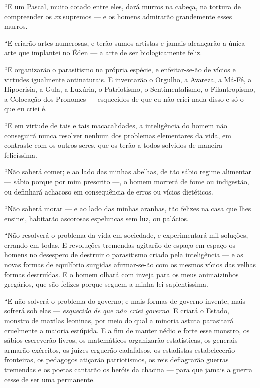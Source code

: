 ``E um Pascal, muito cotado entre eles, dará murros na cabeça, na
tortura de compreender os \emph{xx} supremos --- e os homens admirarão
grandemente esses murros.

``E criarão artes numerosas, e terão sumos artistas e jamais alcançarão
a única arte que implantei no Éden --- a arte de ser biologicamente
feliz.

``E organizarão o parasitismo na própria espécie, e enfeitar-se-ão de
vícios e virtudes igualmente antinaturais. E inventarão o Orgulho, a
Avareza, a Má-Fé, a Hipocrisia, a Gula, a Luxúria, o Patriotismo, o
Sentimentalismo, o Filantropismo, a Colocação dos Pronomes ---
esquecidos de que eu não criei nada disso e só o que eu criei é.

``E em virtude de tais e tais macacalidades, a inteligência do homem não
conseguirá nunca resolver nenhum dos problemas elementares da vida, em
contraste com os outros seres, que os terão a todos solvidos de maneira
felicíssima.

``Não saberá comer; e ao lado das minhas abelhas, de tão sábio regime
alimentar --- sábio porque por mim prescrito ---, o homem morrerá de
fome ou indigestão, ou definhará achacoso em consequência de erros ou
vícios dietéticos.

``Não saberá morar --- e ao lado das minhas aranhas, tão felizes na casa
que lhes ensinei, habitarão ascorosas espeluncas sem luz, ou palácios.

``Não resolverá o problema da vida em sociedade, e experimentará mil
soluções, errando em todas. E revoluções tremendas agitarão de espaço em
espaço os homens no desespero de destruir o parasitismo criado pela
inteligência --- e as novas formas de equilíbrio surgidas afirmar-se-ão
com os mesmos vícios das velhas formas destruídas. E o homem olhará com
inveja para os meus animaizinhos gregários, que são felizes porque
seguem a minha lei sapientíssima.

``E não solverá o problema do governo; e mais formas de governo invente,
mais sofrerá sob elas --- \emph{esquecido de que não criei governo}. E
criará o Estado, monstro de maxilas leoninas, por meio do qual a minoria
astuta parasitará cruelmente a maioria estúpida. E a fim de manter nédio
e forte esse monstro, os sábios escreverão livros, os matemáticos
organizarão estatísticas, os generais armarão exércitos, os juízes
erguerão cadafalsos, os estadistas estabelecerão fronteiras, os
pedagogos atiçarão patriotismos, os reis deflagrarão guerras tremendas e
os poetas cantarão os heróis da chacina --- para que jamais a guerra
cesse de ser uma permanente.

